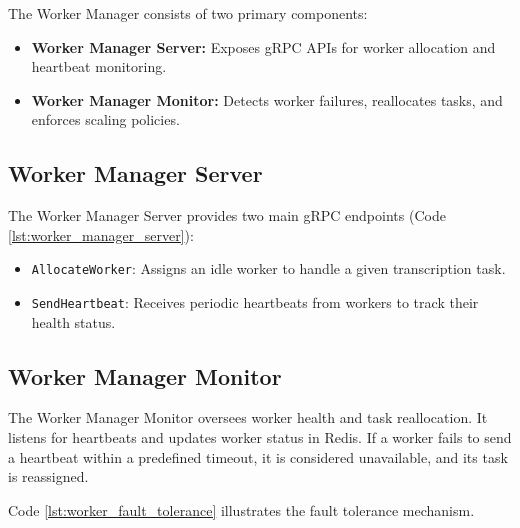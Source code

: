 The Worker Manager consists of two primary components:
\begin{itemize}
    \item \textbf{Worker Manager Server:} Exposes gRPC APIs for worker allocation and heartbeat monitoring.
    \item \textbf{Worker Manager Monitor:} Detects worker failures, reallocates tasks, and enforces scaling policies.
\end{itemize}

\subsection{Worker Manager Server}
The Worker Manager Server provides two main gRPC endpoints (Code \ref{lst:worker_manager_server}):
\begin{itemize}
    \item \texttt{AllocateWorker}: Assigns an idle worker to handle a given transcription task.
    \item \texttt{SendHeartbeat}: Receives periodic heartbeats from workers to track their health status.
\end{itemize}


\subsection{Worker Manager Monitor}
The Worker Manager Monitor oversees worker health and task reallocation. It listens for heartbeats and updates worker status in Redis. If a worker fails to send a heartbeat within a predefined timeout, it is considered unavailable, and its task is reassigned. 

Code \ref{lst:worker_fault_tolerance} illustrates the fault tolerance mechanism.

